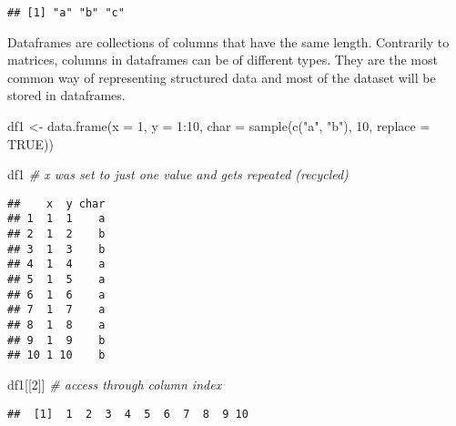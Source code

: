 \documentclass[
  oneside]{book}
\newenvironment{Shaded}{\begin{snugshade}}{\end{snugshade}}
\newcommand{\AttributeTok}[1]{\textcolor[rgb]{0.77,0.63,0.00}{#1}}
\newcommand{\CommentTok}[1]{\textcolor[rgb]{0.56,0.35,0.01}{\textit{#1}}}
\newcommand{\ConstantTok}[1]{\textcolor[rgb]{0.00,0.00,0.00}{#1}}
\newcommand{\DecValTok}[1]{\textcolor[rgb]{0.00,0.00,0.81}{#1}}
\newcommand{\FunctionTok}[1]{\textcolor[rgb]{0.00,0.00,0.00}{#1}}
\newcommand{\NormalTok}[1]{#1}
\newcommand{\OtherTok}[1]{\textcolor[rgb]{0.56,0.35,0.01}{#1}}
\newcommand{\SpecialCharTok}[1]{\textcolor[rgb]{0.00,0.00,0.00}{#1}}
\newcommand{\StringTok}[1]{\textcolor[rgb]{0.31,0.60,0.02}{#1}}
\begin{document}
\begin{Shaded}
\end{Shaded}

\begin{verbatim}
## [1] "a" "b" "c"
\end{verbatim}

Dataframes are collections of columns that have the same length.
Contrarily to matrices, columns in dataframes can be of different types.
They are the most common way of representing structured data and
most of the dataset will be stored in dataframes.

\begin{Shaded}
\begin{Highlighting}[]
\NormalTok{df1 }\OtherTok{\textless{}{-}} \FunctionTok{data.frame}\NormalTok{(}\AttributeTok{x =} \DecValTok{1}\NormalTok{, }\AttributeTok{y =} \DecValTok{1}\SpecialCharTok{:}\DecValTok{10}\NormalTok{,}
           \AttributeTok{char =} \FunctionTok{sample}\NormalTok{(}\FunctionTok{c}\NormalTok{(}\StringTok{"a"}\NormalTok{, }\StringTok{"b"}\NormalTok{), }\DecValTok{10}\NormalTok{, }\AttributeTok{replace =} \ConstantTok{TRUE}\NormalTok{))}

\NormalTok{df1 }\CommentTok{\# x was set to just one value and gets repeated (\textquotesingle{}recycled\textquotesingle{})}
\end{Highlighting}
\end{Shaded}

\begin{verbatim}
##    x  y char
## 1  1  1    a
## 2  1  2    b
## 3  1  3    b
## 4  1  4    a
## 5  1  5    a
## 6  1  6    a
## 7  1  7    a
## 8  1  8    a
## 9  1  9    b
## 10 1 10    b
\end{verbatim}

\begin{Shaded}
\begin{Highlighting}[]
\NormalTok{df1[[}\DecValTok{2}\NormalTok{]] }\CommentTok{\# access through column index}
\end{Highlighting}
\end{Shaded}

\begin{verbatim}
##  [1]  1  2  3  4  5  6  7  8  9 10
\end{verbatim}

\begin{Shaded}
\end{Shaded}
\end{document}
